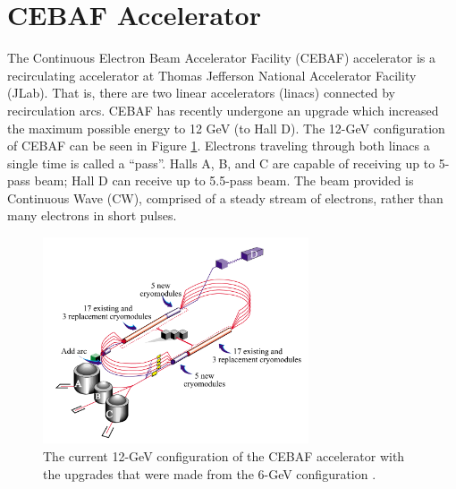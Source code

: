 \section{CEBAF Accelerator}

The Continuous Electron Beam Accelerator Facility (CEBAF) accelerator is a recirculating accelerator at Thomas Jefferson National Accelerator Facility (JLab). That is, there are two linear accelerators (linacs) connected by recirculation arcs. CEBAF has recently undergone an upgrade which increased the maximum possible energy to 12 GeV (to Hall D). The 12-GeV configuration of CEBAF can be seen in Figure \ref{fig:cebaf}. Electrons traveling through both linacs a single time is called a ``pass''. Halls A, B, and C are capable of receiving up to 5-pass beam; Hall D can receive up to 5.5-pass beam. The beam provided is Continuous Wave (CW), comprised of a steady stream of electrons, rather than many electrons in short pulses.

\begin{figure}[h]
\begin{center}
\includegraphics[width=0.7\textwidth]{./setup/fig/cebaf.png}
\caption{The current 12-GeV configuration of the CEBAF accelerator with the upgrades that were made from the 6-GeV configuration \cite{12gevWP}.}
\label{fig:cebaf}
\end{center}
\end{figure}

